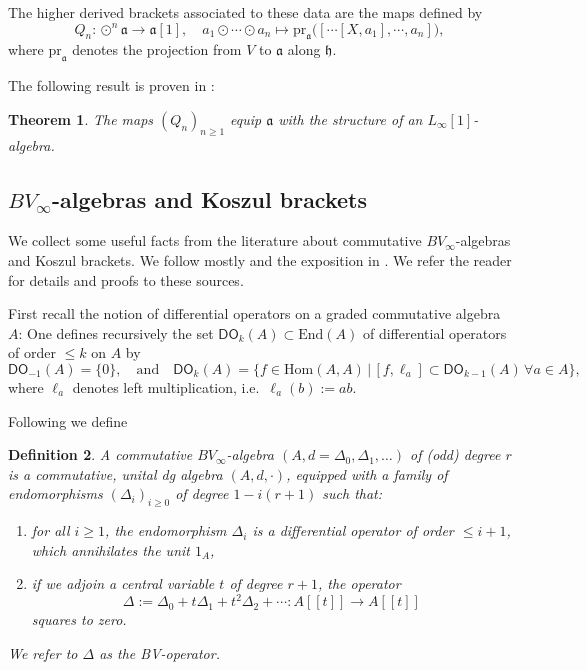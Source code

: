 \documentclass[11pt,thmsa]{amsart}
\newtheorem{theorem}{Theorem}[section]
\newtheorem{definition}[theorem]{Definition}
\theoremstyle{definition}
\newcommand{\Hom}{\mathrm{Hom}}
\newcommand{\Diffop}{\mathsf{DO}}
\begin{document}
The higher derived brackets associated to these data are the maps defined by
$$ Q_n: \odot^n\mathfrak{a} \to \mathfrak{a}[1], \quad a_1\odot \cdots \odot a_n \mapsto \mathrm{pr}_{\mathfrak{a}}\Big([\cdots [X,a_1],\cdots,a_n]\Big),$$
where $\mathrm{pr}_{\mathfrak{a}}$ denotes the projection from $V$ to $\mathfrak{a}$ along $\mathfrak{h}$.

The following result is proven in \cite{Voronov1}:

\begin{theorem}\label{theorem: higher derived brackets}
The maps $(Q_n)_{n\ge 1}$ equip $\mathfrak{a}$ with the structure of an $L_\infty[1]$-algebra.
\end{theorem}

\subsection{$BV_\infty$-algebras and Koszul brackets}
\label{appendix: BV}

We collect some useful facts from the literature about commutative $BV_\infty$-algebras and Koszul brackets. We follow mostly
\cite{Koszul,Kravchenko} and the exposition in \cite[Section 4.2.1]{Bandiera_PhD-thesis}.
We refer the reader for details and proofs to these sources.

First recall the notion of differential operators on a graded commutative algebra $A$: One defines recursively the set $\Diffop_k(A) \subset \mathrm{End}(A)$ of differential operators
of order $\le k$ on $A$ by
$$ \Diffop_{-1}(A)=\{0\}, \quad \textrm{and} \quad \Diffop_k(A) =\{f\in \Hom(A,A) \, \vert \, [f,\ell_a]\subset \Diffop_{k-1}(A) \, \forall a \in A\},$$
where $\ell_a$ denotes left multiplication, i.e.~$\ell_a(b):=ab$.

Following \cite{Kravchenko} we define

\begin{definition}\label{definition: comm BV-infty}
A \emph{commutative $BV_\infty$-algebra} $(A,d=\Delta_0,\Delta_1,\dots)$
of (odd) degree $r$ is a commutative, unital dg algebra $(A,d,\cdot)$,
equipped with a family of endomorphisms $(\Delta_i)_{i\ge 0}$
of degree $1-i(r+1)$ such  that:
\begin{enumerate}
\item for all $i\ge 1$, the endomorphism $\Delta_i$ is a differential operator of order $\le i+1$,
which annihilates the unit $1_A$,
\item if we adjoin a central variable $t$ of degree $r+1$, the operator
$$ \Delta:= \Delta_0 + t \Delta_1 + t^2 \Delta_2+\cdots: A[[t]]\to A[[t]]$$
squares to zero.
\end{enumerate}
We refer to $\Delta$ as the BV-operator.
\end{definition}
\end{document}
